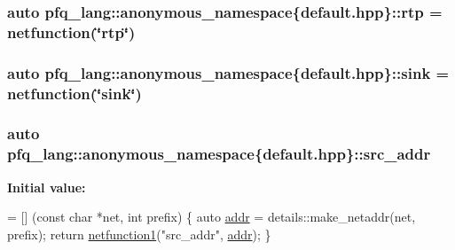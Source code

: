 \hypertarget{namespacepfq__lang_1_1anonymous__namespace_02default_8hpp_03_a13ac072f4d7f860256ef22d7f5a1a9ac}{
\subsubsection[{rtp}]{\setlength{\rightskip}{0pt plus 5cm}auto pfq\-\_\-lang\-::anonymous\-\_\-namespace\{default.\-hpp\}\-::rtp = {\bf netfunction}(\char`\"{}rtp\char`\"{})}}\label{namespacepfq__lang_1_1anonymous__namespace_02default_8hpp_03_a13ac072f4d7f860256ef22d7f5a1a9ac}
\hypertarget{namespacepfq__lang_1_1anonymous__namespace_02default_8hpp_03_ad708862e729d0cc6a217d86bb25b1061}{
\subsubsection[{sink}]{\setlength{\rightskip}{0pt plus 5cm}auto pfq\-\_\-lang\-::anonymous\-\_\-namespace\{default.\-hpp\}\-::sink = {\bf netfunction}(\char`\"{}sink\char`\"{})}}\label{namespacepfq__lang_1_1anonymous__namespace_02default_8hpp_03_ad708862e729d0cc6a217d86bb25b1061}
\hypertarget{namespacepfq__lang_1_1anonymous__namespace_02default_8hpp_03_a63c87ff605d7cefa807fd61bc463785d}{
\subsubsection[{src\-\_\-addr}]{\setlength{\rightskip}{0pt plus 5cm}auto pfq\-\_\-lang\-::anonymous\-\_\-namespace\{default.\-hpp\}\-::src\-\_\-addr}}\label{namespacepfq__lang_1_1anonymous__namespace_02default_8hpp_03_a63c87ff605d7cefa807fd61bc463785d}
{\bfseries Initial value\-:}
\begin{DoxyCode}
= [] (\textcolor{keyword}{const} \textcolor{keywordtype}{char} *net, \textcolor{keywordtype}{int} prefix)
        \{
            \textcolor{keyword}{auto} \hyperlink{namespacepfq__lang_1_1anonymous__namespace_02default_8hpp_03_aafce8334d1be83bff9a2115439c8c453}{addr} = details::make\_netaddr(net, prefix);
            \textcolor{keywordflow}{return} \hyperlink{namespacepfq__lang_af215f25fa7ebd61fdc90cf0ef78a3164}{netfunction1}(\textcolor{stringliteral}{"src\_addr"}, \hyperlink{namespacepfq__lang_1_1anonymous__namespace_02default_8hpp_03_aafce8334d1be83bff9a2115439c8c453}{addr});
        \}
\end{DoxyCode}
